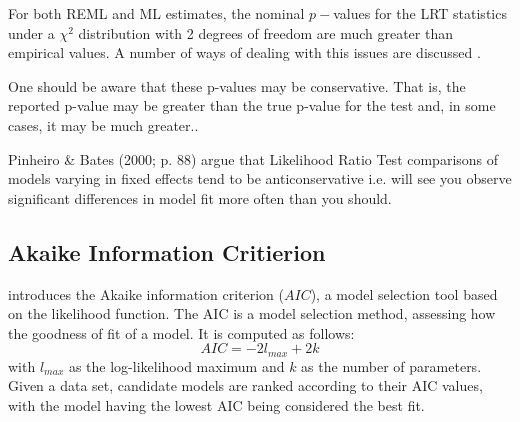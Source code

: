 \documentclass[12pt, a4paper]{report}
\theoremstyle{plain}
\theoremstyle{definition}
\theoremstyle{remark}
\begin{document}
	
	
	
	
	
	
	
	For both REML and ML estimates, the nominal $p-$values for the LRT statistics under a $\chi^2$ distribution with 2 degrees of freedom are much greater than empirical values. A number of ways of dealing with this issues are discussed \citep[pg.86]{pb}.
	
	One should be aware that these p-values may be conservative. That is, the reported p-value may be greater than the true p-value for the test and, in some cases, it may be much greater.\citep[pg.87]{pb}.
	
	
	
	Pinheiro \& Bates (2000; p. 88) argue that Likelihood Ratio Test comparisons of models varying in fixed effects tend to be anticonservative i.e. 
	will see you observe significant differences in model fit more often than you should. 
	
	
	
	
	\subsection{Akaike Information Critierion}
	\citet{akaike} introduces the Akaike information criterion ($AIC$), a model selection tool based on the likelihood function. The AIC is a model selection method, assessing how the goodness of
	fit of a model. It is computed as follows:
	\begin{displaymath}
	AIC = -2l_{max}+ 2k
	\end{displaymath}
	with $l_{max}$ as the log-likelihood maximum and $k$ as the number
	of parameters. Given a data set, candidate models are ranked according to their AIC values, with the model having the lowest AIC being considered the best fit.
	
\end{document}
